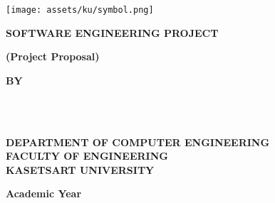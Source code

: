 \thispagestyle{empty}
\begin{center}

    \texttt{[image: assets/ku/symbol.png]}\vspace{.7in}

    {\huge\textbf{SOFTWARE ENGINEERING PROJECT}}\vspace{1in}

    {\huge\textbf{\usevar{\srsTitle}}}\vspace{0.5in}
    {\huge\textbf{(Project Proposal)}}\vspace{1in}

    {\huge\textbf{BY}}\vspace{.5in}

    {\huge\textbf{%
        \usevar{\srsAuthorOne} \\
        \usevar{\srsAuthorTwo} \\
    }}\vfill

    {\Large\textbf{%
        DEPARTMENT OF COMPUTER ENGINEERING\\
        FACULTY OF ENGINEERING\\
        KASETSART UNIVERSITY\\
    }}\vspace{.5in}

    {\LARGE\textbf{Academic Year \usevar{\srsAcademicYear}}}

\end{center}
\restoregeometry